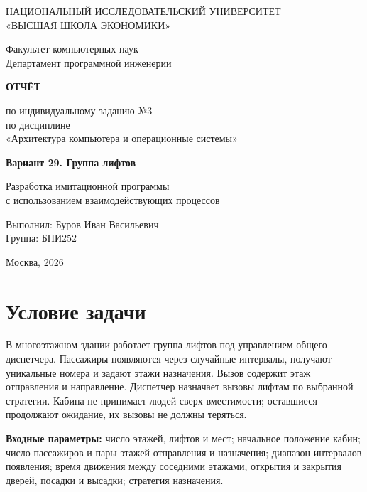 \documentclass[12pt,a4paper]{article}
\begin{document}
\hypersetup{pageanchor=false}
\begin{titlepage}
\centering
\vspace*{20mm}
{\large НАЦИОНАЛЬНЫЙ ИССЛЕДОВАТЕЛЬСКИЙ УНИВЕРСИТЕТ\\
«ВЫСШАЯ ШКОЛА ЭКОНОМИКИ»\par}
\vspace{6mm}
{\large Факультет компьютерных наук\\
Департамент программной инженерии\par}
\vfill
{\Large\bfseries ОТЧЁТ\par}
\vspace{4mm}
{\Large по индивидуальному заданию №3\\
по дисциплине\\
«Архитектура компьютера и операционные системы»\par}
\vspace{12mm}
{\large\bfseries Вариант 29. Группа лифтов\par}
\vspace{3mm}
{\large Разработка имитационной программы\\
с использованием взаимодействующих процессов\par}
\vfill
\begin{flushright}
{\large Выполнил: Буров Иван Васильевич\\
Группа: БПИ252\par}
\end{flushright}
\vspace{12mm}
{\large Москва, 2026\par}
\end{titlepage}
\hypersetup{pageanchor=true}

\section{Условие задачи}

В многоэтажном здании работает группа лифтов под управлением общего
диспетчера. Пассажиры появляются через случайные интервалы, получают
уникальные номера и задают этажи назначения. Вызов содержит этаж
отправления и направление. Диспетчер назначает вызовы лифтам по выбранной
стратегии. Кабина не принимает людей сверх вместимости; оставшиеся
продолжают ожидание, их вызовы не должны теряться.

\textbf{Входные параметры:} число этажей, лифтов и мест; начальное
положение кабин; число пассажиров и пары этажей отправления и назначения;
диапазон интервалов появления; время движения между соседними этажами,
открытия и закрытия дверей, посадки и высадки; стратегия назначения.
\end{document}
